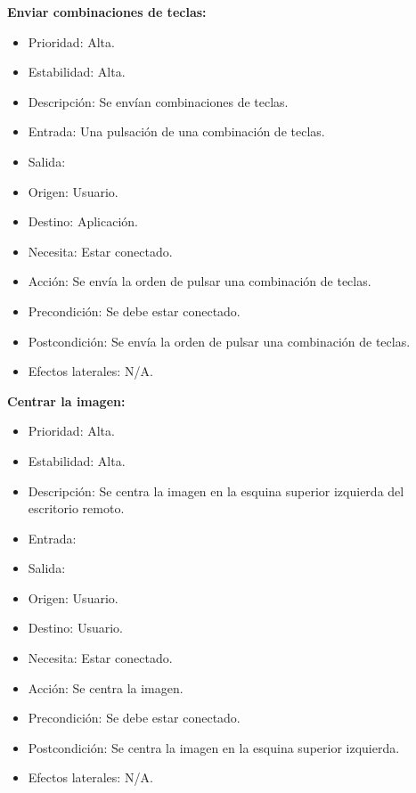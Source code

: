 \textbf{Enviar combinaciones de teclas:}
\begin{itemize}
\item Prioridad: Alta.
\item Estabilidad: Alta.
\item Descripción: Se envían combinaciones de teclas.
\item Entrada: Una pulsación de una combinación de teclas.
\item Salida:
\item Origen: Usuario.
\item Destino: Aplicación.
\item Necesita: Estar conectado.
\item Acción: Se envía la orden de pulsar una combinación de teclas.
\item Precondición: Se debe estar conectado.
\item Postcondición: Se envía la orden de pulsar una combinación de teclas.
\item Efectos laterales: N/A.\\

\end{itemize}
\newpage
\textbf{Centrar la imagen:}
\begin{itemize}
\item Prioridad: Alta.
\item Estabilidad: Alta.
\item Descripción: Se centra la imagen en la esquina superior izquierda del escritorio remoto.
\item Entrada:
\item Salida:
\item Origen: Usuario.
\item Destino: Usuario.
\item Necesita: Estar conectado.
\item Acción: Se centra la imagen.
\item Precondición: Se debe estar conectado.
\item Postcondición: Se centra la imagen en la esquina superior izquierda.
\item Efectos laterales: N/A.\\

\end{itemize}

